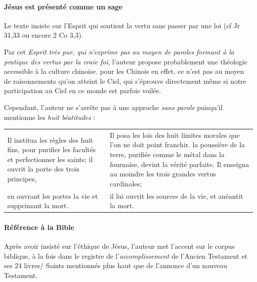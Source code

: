 \paragraph{Jésus est présenté comme un sage} Le texte insiste sur l'Esprit qui soutient la vertu sans passer par une loi (cf Jr 31,33   ou encore 2 Co 3,3).

Par cet  \textit{Esprit très pur, qui n'exprime pas au moyen de paroles formant à la pratique des vertus par la vraie foi}, l'auteur propose probablement une théologie accessible à la culture chinoise. pour les Chinois en effet,  ce n'est pas au moyen de raisonnements qu'on atteint le Ciel, qui s'éprouve directement
\cite[p. 117]{PolDroit:voyage} même si notre participation au Ciel en ce monde est parfois voilée.


Cependant, l'auteur ne s'arrête pas à une approche \textit{sans parole} puisqu'il mentionne les \textit{huit béatitudes} : 

\begin{tabular}{p{}p{}}
\\
Il institua les règles des huit fins, pour purifier les facultés et perfectionner les saints; il ouvrit la porte des trois principes,& Il posa les lois des huit limites morales que l'on ne doit point franchir. la poussière de la terre, purifiée comme le métal dans la fournaise, devint la vérité parfaite. Il enseigna au moindre les trois grandes vertus cardinales; 
\\ 
 en ouvrant les portes la vie et supprimant la mort. & il lui ouvrit les sources de la vie, et anéantit la mort.
\end{tabular}


 \paragraph{Référence à la Bible} Après avoir insisté sur l'éthique de Jésus, l'auteur met l'accent sur le corpus biblique, à la fois dans le registre de l'\textit{accomplissement} de l'Ancien Testament et ses 24 livres/ Saints mentionnés plus haut  que de l'annonce d'un nouveau Testament. 

